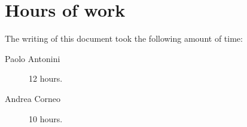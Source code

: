 \chapter{Hours of work}\label{chap:appendix}


The writing of this document took the following amount of time:

\begin{description}
	\item [Paolo Antonini] 12 hours.
	\item [Andrea Corneo] 10 hours.
\end{description}



